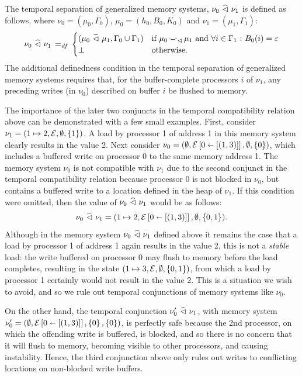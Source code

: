 \documentclass[11pt]{report}
\begin{document}
The temporal separation of generalized memory systems, $\nu_0 \operatorname{\,\widehat{\vartriangleleft}\,} \nu_1$ is defined as follows, where $\nu_0 = (\mu_0,\Gamma_0)$, $\mu_0 = (h_0,B_0,K_0)$ and $\nu_1 = (\mu_1,\Gamma_1)$: \[ \nu_0 \operatorname{\,\widehat{\vartriangleleft}\,} \nu_1 \operatorname{\;=_{\mathit{df}}\;} \begin{cases}
  (\mu_0 \operatorname{\,\widetilde{\vartriangleleft}\,} \mu_1,\Gamma_0 \cup \Gamma_1) & \text{if $\mu_0 \operatorname{\smile}_\vartriangleleft \mu_1$ and $\forall i \in \Gamma_1 \operatorname{\,:\,} B_0(i) = \varepsilon$} \\ 
  \bot & \text{otherwise.}
\end{cases}\] The additional definedness condition in the temporal separation of generalized memory systems requires that, for the buffer-complete processors $i$ of $\nu_1$, any preceding writes (in $\nu_0$) described on buffer $i$ be flushed to memory.

The importance of the later two conjuncts in the temporal compatibility relation above can be demonstrated with a few small examples. First, consider $\nu_1 = (1 \mapsto 2, \mathcal{E}, \operatorname{\emptyset}, \left\lbrace 1 \right\rbrace)$. A load by processor 1 of address 1 in this memory system clearly results in the value 2. Next consider $\nu_0 = (\operatorname{\emptyset},\mathcal{E} \left[ 0 \shortleftarrow \left[(1,3)\right] \right],\operatorname{\emptyset},\left\lbrace 0 \right\rbrace)$, which includes a buffered write on processor 0 to the same memory address 1. The memory system $\nu_0$ is not compatible with $\nu_1$ due to the second conjunct in the temporal compatibility relation because processor 0 is not blocked in $\nu_0$, but contains a buffered write to a location defined in the heap of $\nu_1$. If this condition were omitted, then the value of $\nu_0 \operatorname{\,\widehat{\vartriangleleft}\,} \nu_1$ would be as follows: \[ \nu_0 \operatorname{\,\widehat{\vartriangleleft}\,} \nu_1 = (1 \mapsto 2, \mathcal{E} \left[ 0 \shortleftarrow \left[(1,3)\right] \right], \operatorname{\emptyset}, \left\lbrace 0,1 \right\rbrace).\] Although in the memory system $\nu_0 \operatorname{\,\widehat{\vartriangleleft}\,} \nu_1$ defined above it remains the case that a load by processor 1 of address 1 again results in the value 2, this is not a \emph{stable} load: the write buffered on processor 0 may flush to memory before the load completes, resulting in the state $(1 \mapsto 3, \mathcal{E}, \operatorname{\emptyset}, \left\lbrace 0,1 \right\rbrace)$, from which a load by processor 1 certainly would not result in the value 2. This is a situation we wish to avoid, and so we rule out temporal conjunctions of memory systems like $\nu_0$. 

On the other hand, the temporal conjunction $\nu'_0 \operatorname{\,\widehat{\vartriangleleft}\,} \nu_1$, with memory system $\nu'_0 = (\operatorname{\emptyset},\mathcal{E} \left[ 0 \shortleftarrow \left[(1,3)\right] \right],\left\lbrace 0 \right\rbrace,\left\lbrace 0 \right\rbrace)$, is perfectly safe because the 2nd processor, on which the offending write is buffered, is blocked, and so there is no concern that it will flush to memory, becoming visible to other processors, and causing instability. Hence, the third conjunction above only rules out writes to conflicting locations on non-blocked write buffers. 
\end{document}
